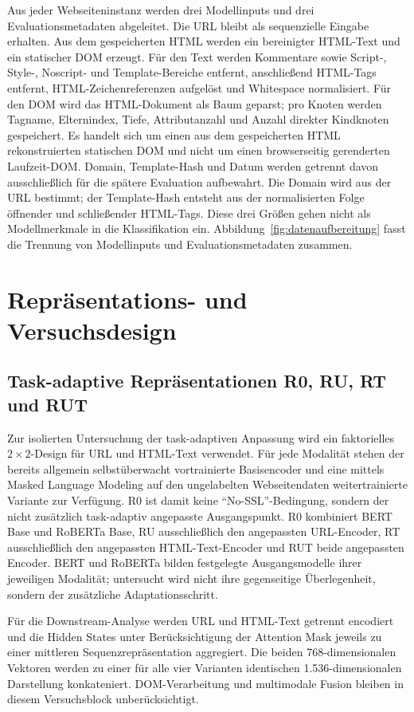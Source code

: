 Aus jeder Webseiteninstanz werden drei Modellinputs und drei Evaluationsmetadaten abgeleitet.
Die URL bleibt als sequenzielle Eingabe erhalten. Aus dem gespeicherten HTML werden ein
bereinigter HTML-Text und ein statischer DOM erzeugt. Für den Text werden Kommentare sowie
Script-, Style-, Noscript- und Template-Bereiche entfernt, anschließend HTML-Tags entfernt,
HTML-Zeichenreferenzen aufgelöst und Whitespace normalisiert. Für den DOM wird das
HTML-Dokument als Baum geparst; pro Knoten werden Tagname, Elternindex, Tiefe,
Attributanzahl und Anzahl direkter Kindknoten gespeichert. Es handelt sich um einen aus dem
gespeicherten HTML rekonstruierten statischen DOM und nicht um einen browserseitig
gerenderten Laufzeit-DOM.
Domain, Template-Hash und Datum werden getrennt davon ausschließlich für die spätere
Evaluation aufbewahrt. Die Domain wird aus der URL bestimmt; der Template-Hash entsteht aus
der normalisierten Folge öffnender und schließender HTML-Tags. Diese drei Größen gehen nicht
als Modellmerkmale in die Klassifikation ein. Abbildung~\ref{fig:datenaufbereitung} fasst die
Trennung von Modellinputs und Evaluationsmetadaten zusammen.

\section{Repräsentations- und Versuchsdesign}

\subsection{Task-adaptive Repräsentationen R0, RU, RT und RUT}

Zur isolierten Untersuchung der task-adaptiven Anpassung wird ein faktorielles
$2\times2$-Design für URL und HTML-Text verwendet. Für jede Modalität stehen der bereits
allgemein selbstüberwacht vortrainierte Basisencoder und eine mittels Masked Language Modeling
auf den ungelabelten Webseitendaten weitertrainierte Variante zur Verfügung. R0 ist damit
keine ``No-SSL''-Bedingung, sondern der nicht zusätzlich task-adaptiv angepasste Ausgangspunkt.
R0 kombiniert BERT Base und RoBERTa Base, RU ausschließlich den angepassten URL-Encoder,
RT ausschließlich den angepassten HTML-Text-Encoder und RUT beide angepassten Encoder.
BERT und RoBERTa bilden festgelegte Ausgangsmodelle ihrer jeweiligen Modalität; untersucht
wird nicht ihre gegenseitige Überlegenheit, sondern der zusätzliche Adaptationsschritt.

Für die Downstream-Analyse werden URL und HTML-Text getrennt encodiert und die Hidden
States unter Berücksichtigung der Attention Mask jeweils zu einer mittleren
Sequenzrepräsentation aggregiert. Die beiden 768-dimensionalen Vektoren werden zu einer für
alle vier Varianten identischen 1.536-dimensionalen Darstellung konkateniert. DOM-Verarbeitung
und multimodale Fusion bleiben in diesem Versuchsblock unberücksichtigt.

